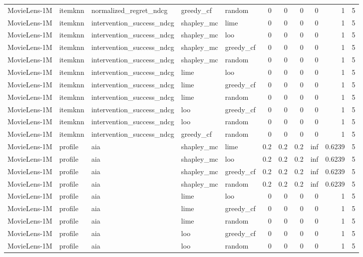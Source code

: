 \begin{table}[t]
{\begin{tabular}{lllllrrrrrr}
MovieLens-1M & itemknn & normalized\_regret\_ndcg & greedy\_cf & random & 0 & 0 & 0 & 0 & 1 & 5 \\
MovieLens-1M & itemknn & intervention\_success\_ndcg & shapley\_mc & lime & 0 & 0 & 0 & 0 & 1 & 5 \\
MovieLens-1M & itemknn & intervention\_success\_ndcg & shapley\_mc & loo & 0 & 0 & 0 & 0 & 1 & 5 \\
MovieLens-1M & itemknn & intervention\_success\_ndcg & shapley\_mc & greedy\_cf & 0 & 0 & 0 & 0 & 1 & 5 \\
MovieLens-1M & itemknn & intervention\_success\_ndcg & shapley\_mc & random & 0 & 0 & 0 & 0 & 1 & 5 \\
MovieLens-1M & itemknn & intervention\_success\_ndcg & lime & loo & 0 & 0 & 0 & 0 & 1 & 5 \\
MovieLens-1M & itemknn & intervention\_success\_ndcg & lime & greedy\_cf & 0 & 0 & 0 & 0 & 1 & 5 \\
MovieLens-1M & itemknn & intervention\_success\_ndcg & lime & random & 0 & 0 & 0 & 0 & 1 & 5 \\
MovieLens-1M & itemknn & intervention\_success\_ndcg & loo & greedy\_cf & 0 & 0 & 0 & 0 & 1 & 5 \\
MovieLens-1M & itemknn & intervention\_success\_ndcg & loo & random & 0 & 0 & 0 & 0 & 1 & 5 \\
MovieLens-1M & itemknn & intervention\_success\_ndcg & greedy\_cf & random & 0 & 0 & 0 & 0 & 1 & 5 \\
MovieLens-1M & profile & aia & shapley\_mc & lime & 0.2 & 0.2 & 0.2 & inf & 0.6239 & 5 \\
MovieLens-1M & profile & aia & shapley\_mc & loo & 0.2 & 0.2 & 0.2 & inf & 0.6239 & 5 \\
MovieLens-1M & profile & aia & shapley\_mc & greedy\_cf & 0.2 & 0.2 & 0.2 & inf & 0.6239 & 5 \\
MovieLens-1M & profile & aia & shapley\_mc & random & 0.2 & 0.2 & 0.2 & inf & 0.6239 & 5 \\
MovieLens-1M & profile & aia & lime & loo & 0 & 0 & 0 & 0 & 1 & 5 \\
MovieLens-1M & profile & aia & lime & greedy\_cf & 0 & 0 & 0 & 0 & 1 & 5 \\
MovieLens-1M & profile & aia & lime & random & 0 & 0 & 0 & 0 & 1 & 5 \\
MovieLens-1M & profile & aia & loo & greedy\_cf & 0 & 0 & 0 & 0 & 1 & 5 \\
MovieLens-1M & profile & aia & loo & random & 0 & 0 & 0 & 0 & 1 & 5 \\

\end{tabular}}
\end{table}
